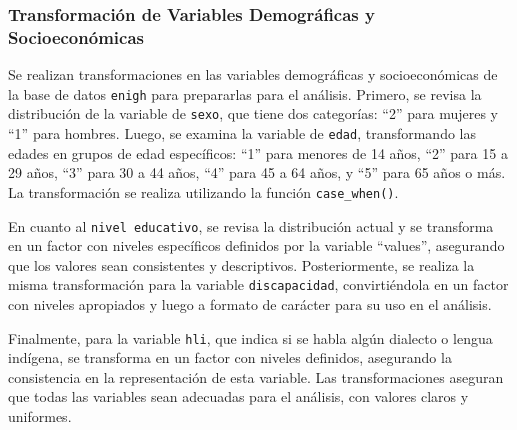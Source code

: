 \documentclass[
  12pt,
]{book}
\begin{document}
\hypertarget{transformaciuxf3n-de-variables-demogruxe1ficas-y-socioeconuxf3micas}{%
\subsubsection*{Transformación de Variables Demográficas y Socioeconómicas}\label{transformaciuxf3n-de-variables-demogruxe1ficas-y-socioeconuxf3micas}}

Se realizan transformaciones en las variables demográficas y socioeconómicas de la base de datos \texttt{enigh} para prepararlas para el análisis. Primero, se revisa la distribución de la variable de \texttt{sexo}, que tiene dos categorías: ``2'' para mujeres y ``1'' para hombres. Luego, se examina la variable de \texttt{edad}, transformando las edades en grupos de edad específicos: ``1'' para menores de 14 años, ``2'' para 15 a 29 años, ``3'' para 30 a 44 años, ``4'' para 45 a 64 años, y ``5'' para 65 años o más. La transformación se realiza utilizando la función \texttt{case\_when()}.

En cuanto al \texttt{nivel\ educativo}, se revisa la distribución actual y se transforma en un factor con niveles específicos definidos por la variable ``values'', asegurando que los valores sean consistentes y descriptivos. Posteriormente, se realiza la misma transformación para la variable \texttt{discapacidad}, convirtiéndola en un factor con niveles apropiados y luego a formato de carácter para su uso en el análisis.

Finalmente, para la variable \texttt{hli}, que indica si se habla algún dialecto o lengua indígena, se transforma en un factor con niveles definidos, asegurando la consistencia en la representación de esta variable. Las transformaciones aseguran que todas las variables sean adecuadas para el análisis, con valores claros y uniformes.
\end{document}
